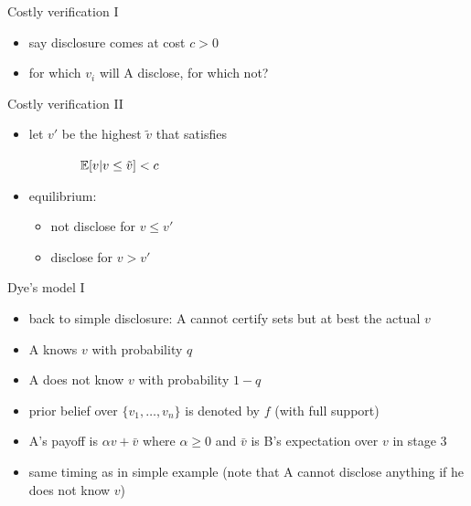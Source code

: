 \documentclass[bigger]{beamer}
\begin{document}
\begin{frame}[label={sec:orgheadline7}]{Costly verification I}
\begin{itemize}
\item say disclosure comes at cost \(c>0\)
\item for which \(v_i\) will A disclose, for which not?
\end{itemize}
\end{frame}

\begin{frame}[label={sec:orgheadline8}]{Costly verification II}
\begin{itemize}
\item let \(v'\) be the highest \(\tilde{v}\) that satisfies
\end{itemize}
\(\hspace*{2cm}\mathbb{E}[v| v\leq \tilde{v}] <c\)
\begin{itemize}
\item equilibrium:
\begin{itemize}
\item not disclose for \(v\leq v'\)
\item disclose for \(v> v'\)
\end{itemize}
\end{itemize}
\end{frame}

\begin{frame}[label={sec:orgheadline9}]{Dye's model I}
\begin{itemize}
\item back to simple disclosure: A cannot certify sets but at best the actual \(v\)
\item A knows \(v\) with probability \(q\)
\item A does not know \(v\) with probability \(1-q\)
\item prior belief over \(\{v_1,\dots,v_n\}\) is denoted by \(f\) (with full support)
\item A's payoff is \(\alpha v+\bar{v}\) where \(\alpha\geq 0\) and \(\bar v\) is B's expectation over \(v\) in stage 3
\item same timing as in simple example (note that A cannot disclose anything if he does not know \(v\))
\end{itemize}
\end{frame}
\end{document}
